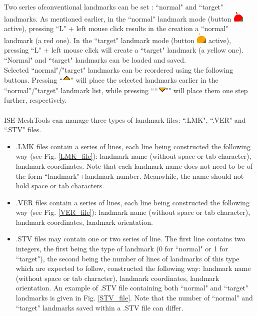 Two series ofconventional landmarks can be set : ``normal" and ``target" landmarks. As mentioned earlier, in the ``normal" landmark mode (button \includegraphics[scale=0.7]{images/pixmap/Landmarks4.png} active), pressing ``L" + left mouse click results in
the creation a ``normal" landmark (a red one). In the ``target" landmark mode (button \includegraphics[scale=0.7]{images/pixmap/Landmarks6.png} active),
pressing ``L" + left mouse click will create a ``target" landmark (a yellow one). ``Normal" and ``target" landmarks can be loaded and saved.\\
Selected ``normal"/"target" landmarks can be reordered using the following buttons. Pressing ``\includegraphics[scale=0.7]{images/pixmap/s_dessous_17.png}"
will place the selected landmarks earlier in the ``normal"/"target" landmark list, while pressing ````\includegraphics[scale=0.7]{images/pixmap/s_dessus_17.png}""
will place them one step further, respectively.\\\\
ISE-MeshTools can manage three types of landmark files: ``.LMK", ``.VER" and ``.STV" files.
\begin{itemize}
\item 
 .LMK files contain a series of lines, each line
being constructed the following way (see Fig. \ref{LMK_file}): landmark
name (without space or tab character),
landmark coordinates. Note that each landmark name does not need to be of the form ``landmark"+landmark number. Meanwhile, the name should not hold space or tab
characters.
\item .VER files contain a series
of lines, each line being
constructed the following
way (see Fig. \ref{VER_file}): landmark name (without space or tab character), landmark coordinates, landmark orientation.
\item .STV files may contain one or two series of line. The first line contains two integers, the first being the type of landmark (0 for ``normal" or 1 for ``target"), the second being the number of lines of landmarks of this type which are expected to follow, constructed the following way: landmark name (without space or tab character), landmark coordinates, landmark orientation. An example of .STV file containing both ``normal" and ``target" landmarks is given in Fig. \ref{STV_file}. Note that the number of ``normal" and ``target" landmarks saved within a .STV file can differ.
\end{itemize}
